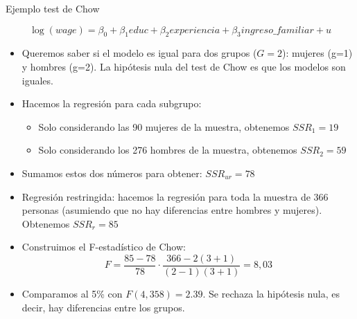 \documentclass{beamer}
\begin{document}
\begin{frame}{Ejemplo test de Chow }


    \[
\log(wage) = \beta_0 + \beta_1 educ + \beta_2 experiencia + \beta_3 ingreso\_familiar + u
\]
{\footnotesize
\begin{itemize}
    \item Queremos saber si el modelo es igual para dos grupos ($G=2$): mujeres (g=1) y hombres (g=2). La hipótesis nula del test de Chow es que los modelos son iguales.
    
  
        \item Hacemos la regresión para cada subgrupo:
        \begin{itemize}
            \item Solo considerando las 90 mujeres de la muestra, obtenemos             $SSR_1 = 19$
            \item Solo considerando los 276 hombres de la muestra, obtenemos 
            $SSR_2 = 59$
        \end{itemize}
        
        \item Sumamos estos dos números para obtener:         $SSR_{ur} = 78$
        
        \item Regresión restringida: hacemos la regresión para toda la muestra de 366 personas (asumiendo que no hay diferencias entre hombres y mujeres). Obtenemos    $SSR_r = 85$
        
        \item Construimos el F-estadístico de Chow:
        \[
        F = \frac{85 - 78}{78} \cdot \frac{366 - 2(3 + 1)}{(2 - 1)(3 + 1)} = 8,03
        \]
        
        \item Comparamos al 5\% con $F(4, 358) = 2.39$. Se rechaza la hipótesis nula, es decir, hay diferencias entre los grupos.
  
\end{itemize}
}
 \end{frame}
\end{document}
